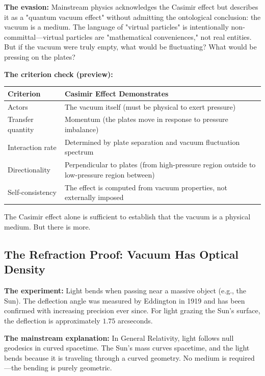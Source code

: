 \documentclass[12pt, a4paper]{article}
\begin{document}
\textbf{The evasion:} Mainstream physics acknowledges the Casimir effect but describes it as a "quantum vacuum effect" without admitting the ontological conclusion: the vacuum is a medium. The language of "virtual particles" is intentionally non-committal—virtual particles are "mathematical conveniences," not real entities. But if the vacuum were truly empty, what would be fluctuating? What would be pressing on the plates?

\textbf{The criterion check (preview):}

\begin{center}
\begin{tabular}{|p{3cm}|p{10cm}|}
\hline
\textbf{Criterion} & \textbf{Casimir Effect Demonstrates} \\
\hline
Actors & The vacuum itself (must be physical to exert pressure) \\
\hline
Transfer quantity & Momentum (the plates move in response to pressure imbalance) \\
\hline
Interaction rate & Determined by plate separation and vacuum fluctuation spectrum \\
\hline
Directionality & Perpendicular to plates (from high-pressure region outside to low-pressure region between) \\
\hline
Self-consistency & The effect is computed from vacuum properties, not externally imposed \\
\hline
\end{tabular}
\end{center}

The Casimir effect alone is sufficient to establish that the vacuum is a physical medium. But there is more.

\subsection{The Refraction Proof: Vacuum Has Optical Density}
\label{subsec:refraction}

\textbf{The experiment:} Light bends when passing near a massive object (e.g., the Sun). The deflection angle was measured by Eddington in 1919 and has been confirmed with increasing precision ever since. For light grazing the Sun's surface, the deflection is approximately \(1.75\) arcseconds.

\textbf{The mainstream explanation:} In General Relativity, light follows null geodesics in curved spacetime. The Sun's mass curves spacetime, and the light bends because it is traveling through a curved geometry. No medium is required—the bending is purely geometric.
\end{document}
